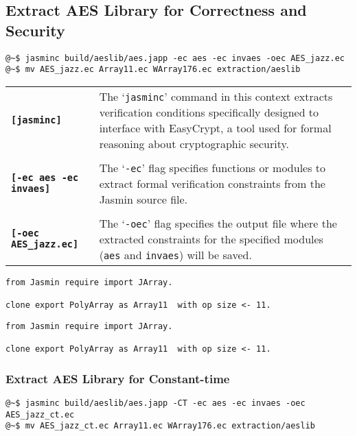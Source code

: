 \subsection{Extract AES Library for Correctness and Security}
\begin{center}

\end{center}
\begin{lstlisting}[style=normal]
@~$ jasminc build/aeslib/aes.japp -ec aes -ec invaes -oec AES_jazz.ec
@~$ mv AES_jazz.ec Array11.ec WArray176.ec extraction/aeslib
\end{lstlisting}
\begin{table}[h!]
\begin{tabularx}{\textwidth}{>{\raggedleft\arraybackslash}p{}p{}}
	\textbf{\texttt{[jasminc]}}  & The `\texttt{jasminc}' command in this context extracts verification conditions specifically designed to interface with EasyCrypt, a tool used for formal reasoning about cryptographic security. \\ \\
	\textbf{\texttt{[-ec aes -ec invaes]}} & The `\texttt{-ec}' flag specifies functions or modules to extract formal verification constraints from the Jasmin source file.
	\\ \\
	\textbf{\texttt{[-oec AES\_jazz.ec]}} & The `\texttt{-oec}' flag specifies the output file where the extracted constraints for the specified modules (\texttt{aes} and \texttt{invaes}) will be saved.
\end{tabularx}
\end{table}
\begin{lstlisting}[style=easycrypt, caption={Array11.ec}, captionpos=t]
from Jasmin require import JArray.

clone export PolyArray as Array11  with op size <- 11.
\end{lstlisting}
\begin{lstlisting}[style=easycrypt, caption={WArray176.ec}, captionpos=t]
from Jasmin require import JArray.

clone export PolyArray as Array11  with op size <- 11.
\end{lstlisting}


\subsubsection{Extract AES Library for Constant-time}
\begin{center}
%
\end{center}
\begin{lstlisting}[style=normal]
@~$ jasminc build/aeslib/aes.japp -CT -ec aes -ec invaes -oec AES_jazz_ct.ec
@~$ mv AES_jazz_ct.ec Array11.ec WArray176.ec extraction/aeslib
\end{lstlisting}
